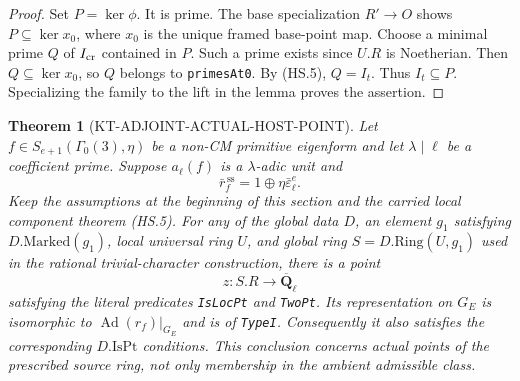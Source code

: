 \documentclass[11pt,a4paper]{article}
\newtheorem{theorem}{Theorem}[section]
\theoremstyle{definition}
\begin{document}
\begin{proof}
Set $P=\ker\phi$.  It is prime.  The base specialization
$R'\to O$ shows $P\subseteq\ker x_0$, where $x_0$ is the
unique framed base-point map.  Choose a minimal prime $Q$ of
$I_{\rm cr}$ contained in $P$.  Such a prime exists since
$U.R$ is Noetherian.  Then $Q\subseteq\ker x_0$, so $Q$
belongs to \texttt{primesAt0}.  By (HS.5), $Q=I_t$.
Thus $I_t\subseteq P$.  Specializing the family to the lift
in the lemma proves the assertion.
\end{proof}

\begin{theorem}[KT-ADJOINT-ACTUAL-HOST-POINT]
Let $f\in S_{e+1}(\Gamma_0(3),\eta)$ be a non-CM primitive
eigenform and let $\lambda\mid\ell$ be a coefficient prime.
Suppose $a_\ell(f)$ is a $\lambda$-adic unit and
\[
 \bar r_f^{\,\mathrm{ss}}
       =1\oplus\eta\bar\varepsilon_\ell^e.                 \tag{HS.11}
\]
Keep the assumptions at the beginning of this section and
the carried local component theorem (HS.5).  For any of the
global data $D$, an element $g_1$ satisfying $D.\mathrm{Marked}(g_1)$,
local universal ring
$U$, and global ring $S=D.\mathrm{Ring}(U,g_1)$ used in the
rational trivial-character  construction,
there is a point
\[
                  z:S.R\longrightarrow\overline{\mathbf Q}_\ell
                                                               \tag{HS.12}
\]
satisfying the literal predicates \texttt{IsLocPt} and
\texttt{TwoPt}.  Its representation on $G_E$ is isomorphic
to $\operatorname{Ad}(r_f)|_{G_E}$ and is of \texttt{TypeI}.
Consequently it also satisfies the corresponding
$D.\mathrm{IsPt}$ conditions.  This conclusion concerns
actual points of the prescribed source ring, not only
membership in the ambient admissible class.
\end{theorem}
\end{document}
